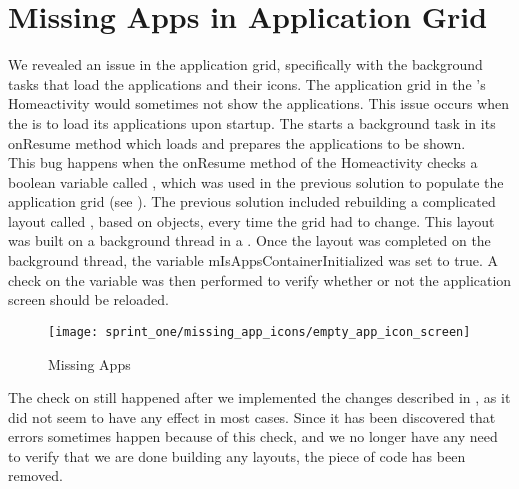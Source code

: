 
\section{Missing Apps in Application Grid}
\label{sec:missing_apps_racecondition}

We revealed an issue in the application grid, specifically with the background tasks that load the applications and their icons. The application grid in the \launcher's Homeactivity would sometimes not show the applications. This issue occurs when the \launcher is to load its applications upon startup. The \launcher starts a background task in its onResume method which loads and prepares the applications to be shown.\\

This bug happens when the onResume method of the Homeactivity checks a boolean variable called , which was used in the previous solution to populate the application grid (see ). The previous solution included rebuilding a complicated layout called , based on  objects, every time the grid had to change. This layout was built on a background thread in a . Once the layout was completed on the background thread, the variable mIsAppsContainerInitialized was set to true. A check on the variable was then performed to verify whether or not the application screen should be reloaded. \\

\begin{figure}[!htbp]
    \centering
    \texttt{[image: sprint\_one/missing\_app\_icons/empty\_app\_icon\_screen]}
    \caption{Missing Apps}
    \label{fig:missing_apps}
\end{figure}

The check on  still happened after we implemented the changes described in , as it did not seem to have any effect in most cases. Since it has been discovered that errors sometimes happen because of this check, and we no longer have any need to verify that we are done building any layouts, the piece of code has been removed. \\